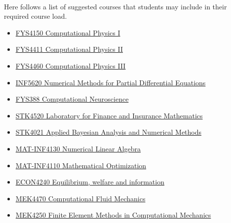 \documentclass[%
twoside,                 %
final,                   %
10pt]{article}
\begin{document}
\paragraph{}
Here follows a list of suggested courses that students may include in their required course load.
\begin{itemize}
\item \href{{http://www.uio.no/studier/emner/matnat/fys/FYS4150/index-eng.html}}{FYS4150 Computational Physics I}

\item \href{{http://www.uio.no/studier/emner/matnat/fys/FYS4411/}}{FYS4411 Computational Physics II}

\item \href{{http://www.uio.no/studier/emner/matnat/fys/FYS4460/}}{FYS4460 Computational Physics III}

\item \href{{http://www.uio.no/studier/emner/matnat/ifi/INF5620/index-eng.html}}{INF5620 Numerical Methods for Partial Differential Equations}

\item \href{{http://www.nmbu.no/course/FYS388}}{FYS388 Computational Neuroscience}

\item \href{{http://www.uio.no/studier/emner/matnat/math/STK4520/index-eng.html}}{STK4520 Laboratory for Finance and Insurance Mathematics}

\item \href{{http://www.uio.no/studier/emner/matnat/math/STK4021/index-eng.html}}{STK4021 Applied Bayesian Analysis and Numerical Methods}

\item \href{{http://www.uio.no/studier/emner/matnat/math/MAT-INF4130/index-eng.html}}{MAT-INF4130  Numerical Linear Algebra}

\item \href{{http://www.uio.no/studier/emner/matnat/math/MAT-INF4110/index.html}}{MAT-INF4110 Mathematical Optimization}

\item \href{{http://www.uio.no/studier/emner/sv/oekonomi/ECON4240/index.html}}{ECON4240 Equilibrium, welfare and information}

\item \href{{http://www.uio.no/studier/emner/matnat/math/MEK4470/index-eng.html}}{MEK4470  Computational Fluid Mechanics}

\item \href{{http://www.uio.no/studier/emner/matnat/math/MEK4250/index-eng.html}}{MEK4250 Finite Element Methods in Computational Mechanics}
\end{itemize}
\end{document}
